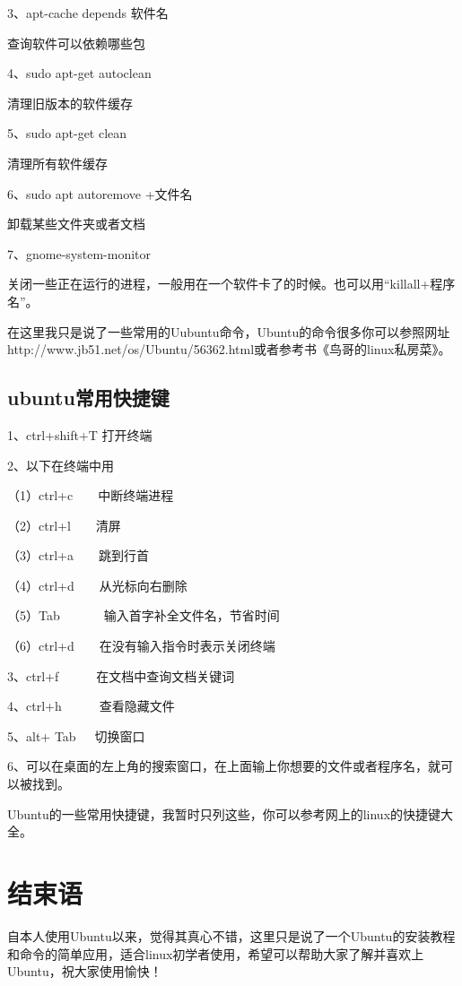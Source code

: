 \documentclass{article}
\begin{document}
3、apt-cache depends 软件名

查询软件可以依赖哪些包

4、sudo apt-get autoclean

 清理旧版本的软件缓存

5、sudo apt-get clean

清理所有软件缓存

6、sudo apt autoremove +文件名

卸载某些文件夹或者文档

7、gnome-system-monitor

关闭一些正在运行的进程，一般用在一个软件卡了的时候。也可以用“killall+程序名”。

在这里我只是说了一些常用的Uubuntu命令，Ubuntu的命令很多你可以参照网址{\color{red}http://www.jb51.net/os/Ubuntu/56362.html}或者参考书{\color{red}《鸟哥的linux私房菜》}。
\subsection{ubuntu常用快捷键}
1、ctrl+shift+T 打开终端

2、以下在终端中用

  （1）ctrl+c~~~~中断终端进程

  （2）ctrl+l~~~~清屏

 （3）ctrl+a~~~~跳到行首

 （4）ctrl+d~~~~从光标向右删除

 （5）Tab~~~~~~~输入首字补全文件名，节省时间

  （6）ctrl+d~~~~在没有输入指令时表示关闭终端

3、ctrl+f~~~~~~在文档中查询文档关键词 
 
4、ctrl+h~~~~~~查看隐藏文件

5、alt+	Tab~~~切换窗口

6、可以在桌面的左上角的搜索窗口，在上面输上你想要的文件或者程序名，就可以被找到。

Ubuntu的一些常用快捷键，我暂时只列这些，你可以参考网上的linux的快捷键大全。
\section{结束语}
自本人使用Ubuntu以来，觉得其真心不错，这里只是说了一个Ubuntu的安装教程和命令的简单应用，适合linux初学者使用，希望可以帮助大家了解并喜欢上Ubuntu，祝大家使用愉快！
\end{document}
